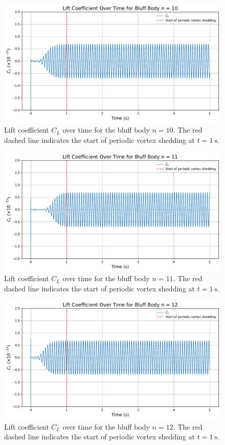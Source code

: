 \begin{figure}[H]
	\centering
	\includegraphics[width=\textwidth]{images/10face_graph}
	\caption{Lift coefficient $C_L$ over time for the bluff body $n=10$. The red dashed line indicates the start of periodic vortex shedding at $t = \SI{1}{\second}$.}
	\label{fig:10FaceGraph} 
\end{figure}

\begin{figure}[H]
	\centering
	\includegraphics[width=\textwidth]{images/11face_graph}
	\caption{Lift coefficient $C_L$ over time for the bluff body $n=11$. The red dashed line indicates the start of periodic vortex shedding at $t = \SI{1}{\second}$.}
	\label{fig:11FaceGraph} 
\end{figure}

\begin{figure}[H]
	\centering
	\includegraphics[width=\textwidth]{images/12face_graph}
	\caption{Lift coefficient $C_L$ over time for the bluff body $n=12$. The red dashed line indicates the start of periodic vortex shedding at $t = \SI{1}{\second}$.}
	\label{fig:12FaceGraph} 
\end{figure}


